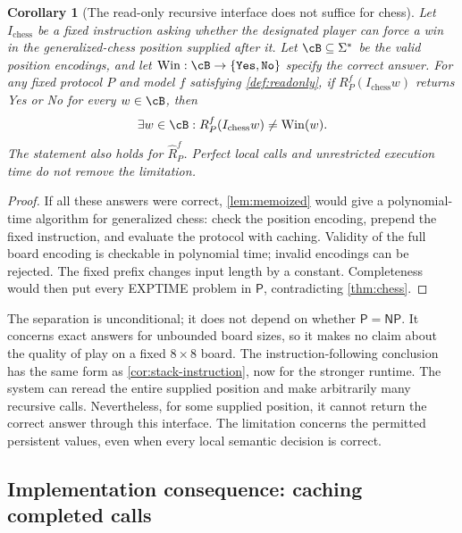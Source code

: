 \documentclass[11pt,twoside]{article}
\newtheorem{corollary}[theorem]{Corollary}
\theoremstyle{definition}
\theoremstyle{remark}
\begin{document}
\begin{corollary}[The read-only recursive interface does not suffice for chess]
\label{cor:readonly-chess}
Let $I_{\mathrm{chess}}$ be a fixed instruction asking whether the designated
player can force a win in the generalized-chess position supplied after it.
Let $\cB\subseteq\Sigma^*$ be the valid position encodings, and let
$\operatorname{Win}:\cB\to\{\mathtt{Yes},\mathtt{No}\}$ specify the correct
answer. For any fixed protocol $P$ and model $f$ satisfying
\cref{def:readonly}, if $R_P^f(I_{\mathrm{chess}}w)$ returns Yes or No for
every $w\in\cB$, then
\begin{equation}
 \exists w\in\cB:\quad R_P^f(I_{\mathrm{chess}}w)\ne\operatorname{Win}(w).
 \label{eq:chess-instruction-failure}
\end{equation}
The statement also holds for $\widehat R_P^f$. Perfect local calls and
unrestricted execution time do not remove the limitation.
\end{corollary}
\begin{proof}
If all these answers were correct, \cref{lem:memoized} would give a
polynomial-time algorithm for generalized chess: check the position
encoding, prepend the fixed instruction, and evaluate the protocol with
caching. Validity of the full board encoding is checkable in polynomial
time; invalid encodings can be rejected. The fixed prefix changes input
length by a constant. Completeness would then put every EXPTIME problem
in $\mathsf P$, contradicting \cref{thm:chess}.
\end{proof}

The separation is unconditional; it does not depend on whether
$\mathsf P=\mathsf{NP}$. It concerns exact answers for unbounded board sizes,
so it makes no claim about the quality of play on a fixed $8\times8$ board.
The instruction-following conclusion has the same form as
\cref{cor:stack-instruction}, now for the stronger runtime. The system can
reread the entire supplied position and make arbitrarily many recursive
calls. Nevertheless, for some supplied position, it cannot return the
correct answer through this interface. The limitation concerns the
permitted persistent values, even when every local semantic decision is
correct.

\subsection{Implementation consequence: caching completed calls}
\label{sec:memoization}
\end{document}
